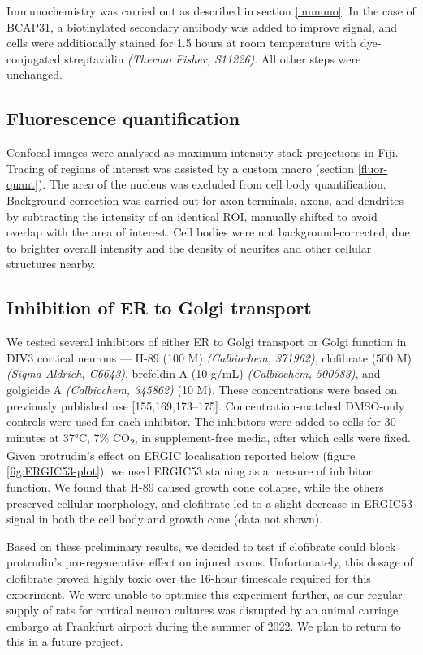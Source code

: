 \documentclass[
  12pt,
  a4paper,
]{book}
\begin{document}
Immunochemistry was carried out as described in section \ref{immuno}. In the case of BCAP31, a biotinylated secondary antibody was added to improve signal, and cells were additionally stained for 1.5 hours at room temperature with dye-conjugated streptavidin \emph{(Thermo Fisher, S11226)}. All other steps were unchanged.

\subsection{Fluorescence quantification}\label{fluorescence-quantification}

Confocal images were analysed as maximum-intensity stack projections in Fiji. Tracing of regions of interest was assisted by a custom macro (section \ref{fluor-quant}). The area of the nucleus was excluded from cell body quantification. Background correction was carried out for axon terminals, axons, and dendrites by subtracting the intensity of an identical ROI, manually shifted to avoid overlap with the area of interest. Cell bodies were not background-corrected, due to brighter overall intensity and the density of neurites and other cellular structures nearby.

\subsection{Inhibition of ER to Golgi transport}\label{inhibition-of-er-to-golgi-transport}

We tested several inhibitors of either ER to Golgi transport or Golgi function in DIV3 cortical neurons --- H-89 (100 \textmu{}M) \emph{(Calbiochem, 371962)}, clofibrate (500 \textmu{}M) \emph{(Sigma-Aldrich, C6643)}, brefeldin A (10 \textmu{}g/mL) \emph{(Calbiochem, 500583)}, and golgicide A \emph{(Calbiochem, 345862)} (10 \textmu{}M). These concentrations were based on previously published use {[}155,169,173--175{]}. Concentration-matched DMSO-only controls were used for each inhibitor. The inhibitors were added to cells for 30 minutes at 37°C, 7\% CO\textsubscript{2}, in supplement-free media, after which cells were fixed. Given protrudin's effect on ERGIC localisation reported below (figure \ref{fig:ERGIC53-plot}), we used ERGIC53 staining as a measure of inhibitor function. We found that H-89 caused growth cone collapse, while the others preserved cellular morphology, and clofibrate led to a slight decrease in ERGIC53 signal in both the cell body and growth cone (data not shown).

Based on these preliminary results, we decided to test if clofibrate could block protrudin's pro-regenerative effect on injured axons. Unfortunately, this dosage of clofibrate proved highly toxic over the 16-hour timescale required for this experiment. We were unable to optimise this experiment further, as our regular supply of rats for cortical neuron cultures was disrupted by an animal carriage embargo at Frankfurt airport during the summer of 2022. We plan to return to this in a future project.
\end{document}
